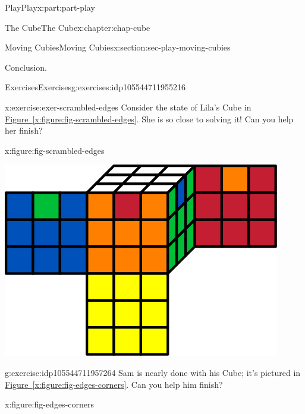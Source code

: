 \documentclass[oneside,10pt,]{book}
\newcommand{\xreffont}{\relax}
\numberwithin{equation}{section}
\begin{document}
\begin{partptx}{Play}{}{Play}{}{}{x:part:part-play}
\begin{chapterptx}{The Cube}{}{The Cube}{}{}{x:chapter:chap-cube}
\begin{sectionptx}{Moving Cubies}{}{Moving Cubies}{}{}{x:section:sec-play-moving-cubies}
\begin{conclusion}{Conclusion.}
\end{conclusion}%
%
%
\typeout{************************************************}
\typeout{************************************************}
%
\begin{exercises-subsection-numberless}{Exercises}{}{Exercises}{}{}{g:exercises:idp105544711955216}
\begin{divisionexercise}{1}{}{}{x:exercise:exer-scrambled-edges}%
Consider the state of Lila's Cube in \hyperref[x:figure:fig-scrambled-edges]{Figure~{\xreffont\ref{x:figure:fig-scrambled-edges}}}. She is so close to solving it! Can you help her finish?%
\begin{figureptx}{}{x:figure:fig-scrambled-edges}{}%
\begin{image}{0.25}{0.5}{0.25}%
\includegraphics[width=\linewidth]{./images/scrambled_edges.svg}
\end{image}%
\tcblower
\end{figureptx}%
\end{divisionexercise}%
\begin{divisionexercise}{2}{}{}{g:exercise:idp105544711957264}%
Sam is nearly done with his Cube; it's pictured in \hyperref[x:figure:fig-edges-corners]{Figure~{\xreffont\ref{x:figure:fig-edges-corners}}}. Can you help him finish?%
\begin{figureptx}{}{x:figure:fig-edges-corners}{}%
\begin{image}{0.25}{0.5}{0.25}%

\end{image}
\end{figureptx}
\end{divisionexercise}
\end{exercises-subsection-numberless}
\end{sectionptx}
\end{chapterptx}
\end{partptx}
\end{document}
